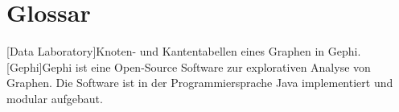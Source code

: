 \chapter*{Glossar}

\begin{acronym}
    [Data Laboratory]{Knoten- und Kantentabellen eines Graphen in Gephi.}
    [Gephi]{Gephi ist eine Open-Source Software zur explorativen
    Analyse von Graphen. Die Software ist in der Programmiersprache Java implementiert
    und modular aufgebaut.}
\end{acronym}
